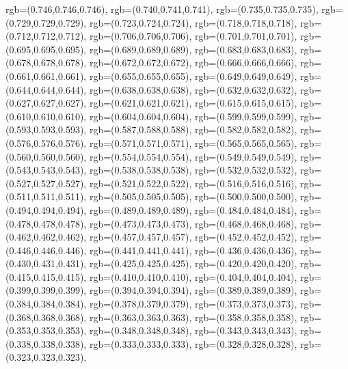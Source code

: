 {{        rgb=(0.746,0.746,0.746),
        rgb=(0.740,0.741,0.741),
        rgb=(0.735,0.735,0.735),
        rgb=(0.729,0.729,0.729),
        rgb=(0.723,0.724,0.724),
        rgb=(0.718,0.718,0.718),
        rgb=(0.712,0.712,0.712),
        rgb=(0.706,0.706,0.706),
        rgb=(0.701,0.701,0.701),
        rgb=(0.695,0.695,0.695),
        rgb=(0.689,0.689,0.689),
        rgb=(0.683,0.683,0.683),
        rgb=(0.678,0.678,0.678),
        rgb=(0.672,0.672,0.672),
        rgb=(0.666,0.666,0.666),
        rgb=(0.661,0.661,0.661),
        rgb=(0.655,0.655,0.655),
        rgb=(0.649,0.649,0.649),
        rgb=(0.644,0.644,0.644),
        rgb=(0.638,0.638,0.638),
        rgb=(0.632,0.632,0.632),
        rgb=(0.627,0.627,0.627),
        rgb=(0.621,0.621,0.621),
        rgb=(0.615,0.615,0.615),
        rgb=(0.610,0.610,0.610),
        rgb=(0.604,0.604,0.604),
        rgb=(0.599,0.599,0.599),
        rgb=(0.593,0.593,0.593),
        rgb=(0.587,0.588,0.588),
        rgb=(0.582,0.582,0.582),
        rgb=(0.576,0.576,0.576),
        rgb=(0.571,0.571,0.571),
        rgb=(0.565,0.565,0.565),
        rgb=(0.560,0.560,0.560),
        rgb=(0.554,0.554,0.554),
        rgb=(0.549,0.549,0.549),
        rgb=(0.543,0.543,0.543),
        rgb=(0.538,0.538,0.538),
        rgb=(0.532,0.532,0.532),
        rgb=(0.527,0.527,0.527),
        rgb=(0.521,0.522,0.522),
        rgb=(0.516,0.516,0.516),
        rgb=(0.511,0.511,0.511),
        rgb=(0.505,0.505,0.505),
        rgb=(0.500,0.500,0.500),
        rgb=(0.494,0.494,0.494),
        rgb=(0.489,0.489,0.489),
        rgb=(0.484,0.484,0.484),
        rgb=(0.478,0.478,0.478),
        rgb=(0.473,0.473,0.473),
        rgb=(0.468,0.468,0.468),
        rgb=(0.462,0.462,0.462),
        rgb=(0.457,0.457,0.457),
        rgb=(0.452,0.452,0.452),
        rgb=(0.446,0.446,0.446),
        rgb=(0.441,0.441,0.441),
        rgb=(0.436,0.436,0.436),
        rgb=(0.430,0.431,0.431),
        rgb=(0.425,0.425,0.425),
        rgb=(0.420,0.420,0.420),
        rgb=(0.415,0.415,0.415),
        rgb=(0.410,0.410,0.410),
        rgb=(0.404,0.404,0.404),
        rgb=(0.399,0.399,0.399),
        rgb=(0.394,0.394,0.394),
        rgb=(0.389,0.389,0.389),
        rgb=(0.384,0.384,0.384),
        rgb=(0.378,0.379,0.379),
        rgb=(0.373,0.373,0.373),
        rgb=(0.368,0.368,0.368),
        rgb=(0.363,0.363,0.363),
        rgb=(0.358,0.358,0.358),
        rgb=(0.353,0.353,0.353),
        rgb=(0.348,0.348,0.348),
        rgb=(0.343,0.343,0.343),
        rgb=(0.338,0.338,0.338),
        rgb=(0.333,0.333,0.333),
        rgb=(0.328,0.328,0.328),
        rgb=(0.323,0.323,0.323),
}}
